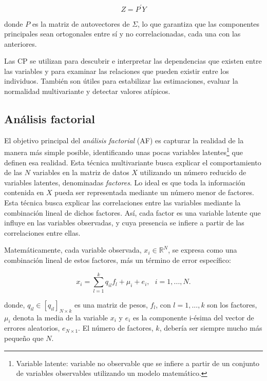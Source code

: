 \[
Z=P^{'}Y
\]

donde $P$ es la matriz de autovectores de $\Sigma$, lo que garantiza que las componentes principales sean ortogonales entre sí y no 
correlacionadas, cada una con las anteriores. \newline

Las CP se utilizan para descubrir e interpretar las dependencias que existen entre las variables y para examinar las relaciones
que pueden existir entre los individuos. También son útiles para estabilizar las estimaciones, evaluar la normalidad
multivariante y detectar valores atípicos. \newline


\subsection{Análisis factorial}

El objetivo principal del \textit{análisis factorial} (AF) es capturar la realidad de la manera más simple posible, identificando 
unas pocas variables latentes\footnote[8]{Variable latente: variable no observable que se infiere a partir de un conjunto de variables 
observables utilizando un modelo matemático. } que definen esa realidad. Esta técnica multivariante busca explicar el comportamiento de las $N$ 
variables en la matriz de datos $X$ utilizando un número reducido de variables latentes, denominadas \textit{factores}. Lo ideal es que toda 
la información contenida en $X$ pueda ser representada mediante un número menor de factores. Esta técnica busca explicar las correlaciones 
entre las variables mediante la combinación lineal de dichos factores. Así, cada factor es una variable latente que 
influye en las variables observadas, y cuya presencia se infiere a partir de las correlaciones entre ellas. \newline

Matemáticamente, cada variable observada, $x_{i}\in \mathbb{R}^{N}$, 
se expresa como una combinación lineal de estos factores, más un término de error específico:

\[
x_{i} = \sum_{l=1}^{k}q_{il}f_{l} + \mu_{i} + e_{i}, \text{ } i=1,...,N.
\]

donde, $q_{il} \in [q_{il}]_{N \times k}$ es una matriz de pesos, $f_{l}$, con $l=1,...,k$ son los factores, $\mu_{i}$ denota la media de la variable
$x_{i}$ y $e_{i}$ es la componente i-ésima del vector de errores aleatorios, $e_{N\times 1}$. El número de factores, $k$, debería ser siempre mucho más pequeño que $N$. \newline

